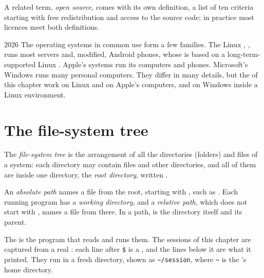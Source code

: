 A related term, \textit{open source}, comes with its own definition, a list of ten criteria starting with free
redistribution and access to the source code; in practice most licences meet both definitions.

\begin{dated}{2026}
The operating systems in common use form a few families. The Linux , , runs most servers and,
modified, Android phones, whose  is based on a long-term-supported Linux . Apple's systems run its
computers and phones. Microsoft's Windows runs many personal computers. They differ in many details, but the
 of this chapter work on Linux and on Apple's computers, and on Windows inside a Linux environment.
\end{dated}

\section{The file-system tree}\label{sec:g11:os-and-command-line:tree}

\begin{definition}\label{def:g11:os-and-command-line:fs-tree}
The \emph{file-system tree} is the arrangement of all the directories (folders) and files of
a system: each directory may contain files and other directories, and all of them are inside one directory, the
\emph{root directory}, written \code{/}.
\end{definition}

\begin{definition}\label{def:g11:os-and-command-line:abs-rel}
An \emph{absolute path} names a file from the root, starting with \code{/}, such as
. Each running program has a \emph{working directory}, and a \emph{relative path}, which does not start with \code{/}, names a file from
there. In a path,  is the directory itself and  its parent.
\end{definition}

The  is the program that reads  and runs them. The sessions of this chapter are captured from a real
: each line after \texttt{\$} is a , and the lines below it are what it printed. They run in a fresh
directory, shown as \texttt{\textasciitilde/session}, where \texttt{\textasciitilde} is the 's home directory.

